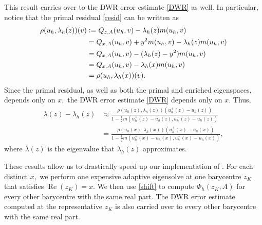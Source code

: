 This result carries over to the DWR error estimate \eqref{DWR} as well. In particular,
notice that the primal residual \eqref{resid} can be written as
\begin{align}
    \rho(u_h, \lambda_h(z))(v) &\vcentcolon= Q_{z, A}(u_h , v) - \lambda_h(z) m(u_h, v) \\
    &= Q_{x, A}(u_h, v) + y^2 m(u_h, v) - \lambda_h(z) m(u_h, v) \\
    &= Q_{x, A}(u_h, v) - (\lambda_h(z) - y^2) m(u_h, v) \\
    &= Q_{x, A}(u_h, v) - \lambda_h(x) m(u_h, v) \\
    &= \rho(u_h, \lambda_h(x))(v).  
\end{align}
Since the primal residual, as well as both the primal and enriched eigenspaces, depends only on $x,$ the DWR error estimate \eqref{DWR} depends only on $x.$ Thus,
\begin{align}
    \lambda(z) - \lambda_h(z) &\approx \frac{\rho(u_h(z), \lambda_h(z))(u_h^+(z) - u_h(z))}{1 - \frac{1}{2} m(u_h^+(z) - u_h(z), u_h^+(z) - u_h(z)) }\\
    &= \frac{\rho(u_h(x), \lambda_h(x))(u_h^+(x) - u_h(x))}{1 - \frac{1}{2} m(u_h^+(x) - u_h(x), u_h^+(x) - u_h(x)) },
\end{align}
where $\lambda(z)$ is the eigenvalue that $\lambda_h(z)$ approximates.

These results allow us to drastically speed up our implementation of . For each distinct $x,$ we perform one expensive adaptive eigensolve at one barycentre $z_K$ that satisfies $\operatorname{Re}(z_K) = x.$ We then use \eqref{shift} to compute $\Phi_h(z_K, A)$ for every other barycentre with the same real part. The DWR error estimate computed at the representative $z_K$ is also carried over to every other barycentre with the same real part. 




